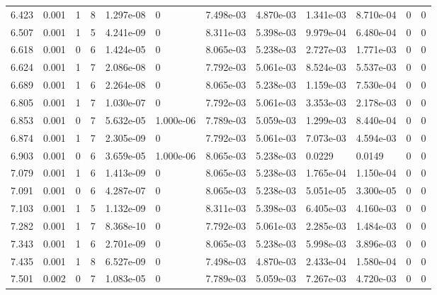 \documentclass[preview]{standalone}
\begin{document}
{{{\begin{tabular}{L{1.2cm}C{1.2cm} C{0.3cm}C{0.5cm} C{1.4cm}C{1.4cm} C{1.4cm}C{1.4cm} C{1.6cm}C{1.6cm} C{1.6cm}C{1.6cm}}
  6.423  &  0.001  & 1     &  8 &  1.297e-08  & 0  &  7.498e-03&   4.870e-03& 1.341e-03 & 8.710e-04   &  0 & 0  \\ 
  6.507  &  0.001  & 1     &  5 &  4.241e-09  & 0  &  8.311e-03&   5.398e-03& 9.979e-04 & 6.480e-04   &  0 & 0  \\ 
  6.618  &  0.001  & 0     &  6 &  1.424e-05  & 0  &  8.065e-03&   5.238e-03& 2.727e-03 & 1.771e-03   &  0 & 0  \\ 
  6.624  &  0.001  & 1     &  7 &  2.086e-08  & 0  &  7.792e-03&   5.061e-03& 8.524e-03 & 5.537e-03   &  0 & 0  \\ 
  6.689  &  0.001  & 1     &  6 &  2.264e-08  & 0  &  8.065e-03&   5.238e-03& 1.159e-03 & 7.530e-04   &  0 & 0  \\ 
  6.805  &  0.001  & 1     &  7 &  1.030e-07  & 0  &  7.792e-03&   5.061e-03& 3.353e-03 & 2.178e-03   &  0 & 0  \\ 
  6.853  &  0.001  & 0     &  7 &  5.632e-05  & 1.000e-06  &  7.789e-03&   5.059e-03& 1.299e-03 & 8.440e-04   &  0 & 0  \\ 
  6.874  &  0.001  & 1     &  7 &  2.305e-09  & 0  &  7.792e-03&   5.061e-03& 7.073e-03 & 4.594e-03   &  0 & 0  \\ 
  6.903  &  0.001  & 0     &  6 &  3.659e-05  & 1.000e-06  &  8.065e-03&   5.238e-03& 0.0229 & 0.0149   &  0 & 0  \\ 
  7.079  &  0.001  & 1     &  6 &  1.413e-09  & 0  &  8.065e-03&   5.238e-03& 1.765e-04 & 1.150e-04   &  0 & 0  \\ 
  7.091  &  0.001  & 0     &  6 &  4.287e-07  & 0  &  8.065e-03&   5.238e-03& 5.051e-05 & 3.300e-05   &  0 & 0  \\ 
  7.103  &  0.001  & 1     &  5 &  1.132e-09  & 0  &  8.311e-03&   5.398e-03& 6.405e-03 & 4.160e-03   &  0 & 0  \\ 
  7.282  &  0.001  & 1     &  7 &  8.368e-10  & 0  &  7.792e-03&   5.061e-03& 2.285e-03 & 1.484e-03   &  0 & 0  \\ 
  7.343  &  0.001  & 1     &  6 &  2.701e-09  & 0  &  8.065e-03&   5.238e-03& 5.998e-03 & 3.896e-03   &  0 & 0  \\ 
  7.435  &  0.001  & 1     &  8 &  6.527e-09  & 0  &  7.498e-03&   4.870e-03& 2.433e-04 & 1.580e-04   &  0 & 0  \\ 
  7.501  &  0.002  & 0     &  7 &  1.083e-05  & 0  &  7.789e-03&   5.059e-03& 7.267e-03 & 4.720e-03   &  0 & 0  \\ 
\hline 
\end{tabular} 

}}}
\end{document}
